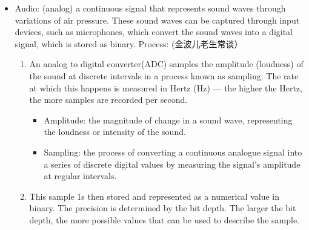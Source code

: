 \documentclass[a4paper,12pt]{article}
\begin{document}
\begin{itemize}
\begin{itemize}
\begin{itemize}
However, in reality, this calculation is not completely accurate, as the image would require 
more data to store metadata and other header information.
            \item Metadata: information that describes other data, providing context and details about the data's content, structure and attributes.
        \end{itemize}
		\item Ways to improve the image quality:
		\begin{itemize}
		    \item Increase image resolution. A higher resolution allows for greater detail and clarity. The trade-off for a higher resolution image is larger file size, which can impact storage and transfer efficiency. 依旧老生常谈
		    \item Increase color depth. When we increase the colour depth, it allows for a wider range of colours to be represented, resulting in more vibrant and accurate images. $2^\text{bit depth}=$ numbers of color available for representation. Mostly 24 bits for modern photos.
		\end{itemize}
	\item When working with graphics, RGB values are often shown in hexadecimal. 
    \end{itemize}
    \item Audio: (analog) a continuous signal that represents sound waves through variations of air pressure. These sound waves can be captured through input devices, such as microphones, which convert the sound waves into a digital signal, which is stored as binary. Process: (金波儿老生常谈）
    \begin{enumerate}
        \item An analog to digital converter(ADC) samples the amplitude (loudness) of the sound at discrete intervals in a process known as sampling. The rate at which this happens is measured in Hertz (Hz) — the higher the Hertz, the more samples are recorded per second.
        \begin{itemize}
            \item Amplitude: the magnitude of change in a sound wave, representing the loudness or intensity of the sound. 
            \item  Sampling: the process of converting a continuous analogue signal into a series of discrete digital values by measuring the signal’s amplitude at regular intervals. 
        \end{itemize}
		\item This sample 1s then stored and represented as a numerical value in binary. The precision is determined by the bit depth. The larger the bit depth, the more possible values that can be used to describe the sample.

\end{enumerate}
\end{itemize}
\end{document}
